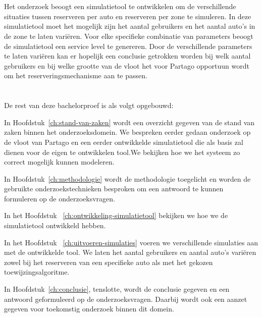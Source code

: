 \section{}
\label{sec:onderzoeksdoelstelling}

Het onderzoek beoogt een simulatietool te ontwikkelen om de verschillende situaties tussen reserveren per auto en reserveren per zone te simuleren. In deze simulatietool moet het mogelijk zijn het aantal gebruikers en het aantal auto's in de zone te laten variëren. Voor elke specifieke combinatie van parameters beoogt de simulatietool een service level te genereren. Door de verschillende parameters te laten variëren kan er hopelijk een conclusie getrokken worden bij welk aantal gebruikers en bij welke grootte van de vloot het voor Partago opportuun wordt om het reserveringsmechanisme aan te passen.

\section{}
\label{sec:opzet-bachelorproef}


De rest van deze bachelorproef is als volgt opgebouwd:

In Hoofdstuk~\ref{ch:stand-van-zaken} wordt een overzicht gegeven van de stand van zaken binnen het onderzoeksdomein. We bespreken eerder gedaan onderzoek op de vloot van Partago en een eerder ontwikkelde simulatietool die als basis zal dienen voor de eigen te ontwikkelen tool.We bekijken hoe we het systeem zo correct mogelijk kunnen modeleren.

In Hoofdstuk~\ref{ch:methodologie} wordt de methodologie toegelicht en worden de gebruikte onderzoekstechnieken besproken om een antwoord te kunnen formuleren op de onderzoeksvragen. 

In het Hoofdstuk ~\ref{ch:ontwikkeling-simulatietool} bekijken we hoe we de simulatietool ontwikkeld hebben.

In het Hoofdstuk ~\ref{ch:uitvoeren-simulaties} voeren we verschillende simulaties aan met de ontwikkelde tool. We laten het aantal gebruikers en aantal auto's variëren zowel bij het reserveren van een specifieke auto als met het gekozen toewijzingsalgoritme. 


In Hoofdstuk~\ref{ch:conclusie}, tenslotte, wordt de conclusie gegeven en een antwoord geformuleerd op de onderzoeksvragen. Daarbij wordt ook een aanzet gegeven voor toekomstig onderzoek binnen dit domein.